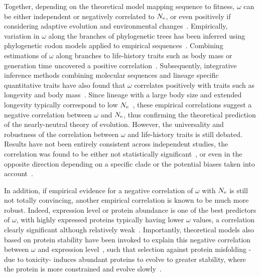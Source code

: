 Together, depending on the theoretical model mapping sequence to fitness, $\omega$ can be either independent or negatively correlated to $N_{\mathrm{e}}$, or even positively if considering adaptive evolution and environmental changes~\citep{Lanfear2014}.
Empirically, variation in $\omega$ along the branches of phylogenetic trees has been inferred using phylogenetic \gls{codon} models applied to empirical sequences~\citep{Yang2001, Zhang2004}.
Combining estimations of $\omega$ along branches to life-history traits such as body mass or generation time uncovered a positive correlation~\citep{Popadin2007, Nikolaev2007}.
Subsequently, integrative inference methods combining molecular sequences and lineage specific quantitative traits have also found that $\omega$ correlates positively with traits such as longevity and body mass~\citep{Lartillot2011, Figuet2017}.
Since lineage with a large body size and extended longevity typically correspond to low $N_{\mathrm{e}}$~\citep{Romiguier2014}, these empirical correlations suggest a negative correlation between $\omega$ and $N_{\mathrm{e}}$, thus confirming the theoretical prediction of the \gls{nearly-neutral} theory of evolution.
However, the universality and robustness of the correlation between $\omega$ and life-history traits is still debated. 
Results have not been entirely consistent across independent studies, the correlation was found to be either not statistically significant~\citep{Lartillot2012}, or even in the opposite direction depending on a specific clade or the potential biases taken into account~\citep{Lanfear2010, Nabholz2013, Lanfear2014, Figuet2016}.

In addition, if empirical evidence for a negative correlation of $\omega$ with $N_{\mathrm{e}}$ is still not totally convincing, another empirical correlation is known to be much more robust.
Indeed, expression level or protein abundance is one of the best predictors of $\omega$, with highly expressed proteins typically having lower $\omega$ values, a correlation clearly significant although relatively weak~\citep{Duret2000, Rocha2004, Drummond2005a, Zhang2015, Song2017}.
Importantly, theoretical models also based on protein stability have been invoked to explain this negative correlation between $\omega$ and expression level~\citep{Wilke2006, Drummond2008}, such that selection against protein misfolding -due to toxicity- induces abundant proteins to evolve to greater stability, where the protein is more constrained and evolve slowly~\citep{Serohijos2012}.


